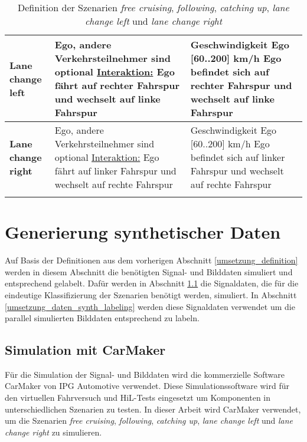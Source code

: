 \begin{longtable}[c]{p{1.5cm} p{6cm} p{6cm}}
\textbf{Lane change left} & Ego, andere Verkehrsteilnehmer sind optional \newline \underline{Interaktion:} Ego fährt auf rechter Fahrspur und wechselt auf linke Fahrspur & Geschwindigkeit Ego [60..200] km/h \newline Ego befindet sich auf rechter Fahrspur und wechselt auf linke Fahrspur \\
\hline

\textbf{Lane change right} & Ego, andere Verkehrsteilnehmer sind optional \newline \underline{Interaktion:} Ego fährt auf linker Fahrspur und wechselt auf rechte Fahrspur & Geschwindigkeit Ego [60..200] km/h \newline Ego befindet sich auf linker Fahrspur und wechselt auf rechte Fahrspur \\
\hline

\caption{Definition der Szenarien \textit{free cruising}, \textit{following}, \textit{catching up}, \textit{lane change left} und \textit{lane change right}}
\label{tab_definition_szenarios}
\end{longtable}
\normalsize

\section{Generierung synthetischer Daten}
\label{umsetzung_daten_synth}

Auf Basis der Definitionen aus dem vorherigen Abschnitt \ref{umsetzung_definition} werden in diesem Abschnitt die benötigten Signal- und Bilddaten simuliert und entsprechend gelabelt. Dafür werden in Abschnitt \ref{umsetzung_daten_synth_simulation} die Signaldaten, die für die eindeutige Klassifizierung der Szenarien benötigt werden, simuliert. In Abschnitt \ref{umsetzung_daten_synth_labeling} werden diese Signaldaten verwendet um die parallel simulierten Bilddaten entsprechend zu labeln.
 
\subsection{Simulation mit CarMaker}
\label{umsetzung_daten_synth_simulation}

Für die Simulation der Signal- und Bilddaten wird die kommerzielle Software CarMaker von IPG Automotive \cite{ipg2018carmaker} verwendet. Diese Simulationssoftware wird für den virtuellen Fahrversuch und \ac{HiL}-Tests eingesetzt um Komponenten in unterschiedlichen Szenarien zu testen. In dieser Arbeit wird CarMaker verwendet, um die Szenarien \textit{free cruising}, \textit{following}, \textit{catching up}, \textit{lane change left} und \textit{lane change right} zu simulieren. 

